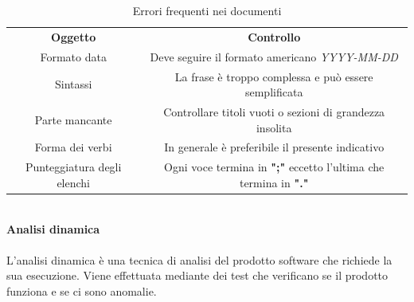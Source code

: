 			\begin{table}[H]
				\centering\renewcommand{\arraystretch}{1.5}
				\caption{Errori frequenti nei documenti}
				\begin{tabular}{c|c}
					
					\rowcolorhead
					{ \textbf{Oggetto}} &
					{ \textbf{Controllo} }\\
					
					\rowcolorlight
					{\colorbody Formato data} & { Deve seguire il formato americano \textit{YYYY-MM-DD}} 
					\\
					
					\rowcolordark
					{\colorbody Sintassi} & {  La frase è troppo complessa e può essere semplificata } 
					\\	
					
					\rowcolorlight
					{\colorbody Parte mancante} & { Controllare titoli vuoti o sezioni di grandezza insolita} 
					\\
					
					\rowcolordark
					{\colorbody Forma dei verbi} & { In generale è preferibile il presente indicativo} 
					\\
					
					\rowcolorlight
					{ Punteggiatura degli elenchi} & { Ogni voce termina in \textbf{";"} eccetto l'ultima che termina in \textbf{"."}} 
					\\
				\end{tabular}
			\end{table}
			\mbox{}\\								
			\textbf{Analisi dinamica} \mbox{}\\ \mbox{}\\
			L'analisi dinamica è una tecnica di analisi del prodotto software che richiede la sua esecuzione. Viene effettuata  mediante dei test che verificano se il prodotto funziona e se ci sono anomalie. 
			
